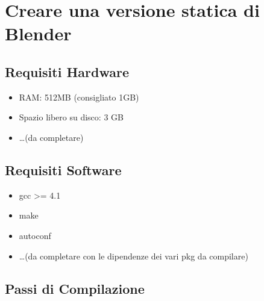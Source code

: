 
\section{Creare una versione statica di Blender} \label{sec:blender}

\subsection{Requisiti Hardware}

\begin{itemize}
\item RAM: 512MB (consigliato 1GB)
\item Spazio libero su disco: 3 GB
\item \dots (da completare)
\end{itemize}

\subsection{Requisiti Software}

\begin{itemize}
\item gcc >= 4.1
\item make
\item autoconf
\item \dots (da completare con le dipendenze dei vari pkg da compilare)
\end{itemize}

\subsection{Passi di Compilazione}

